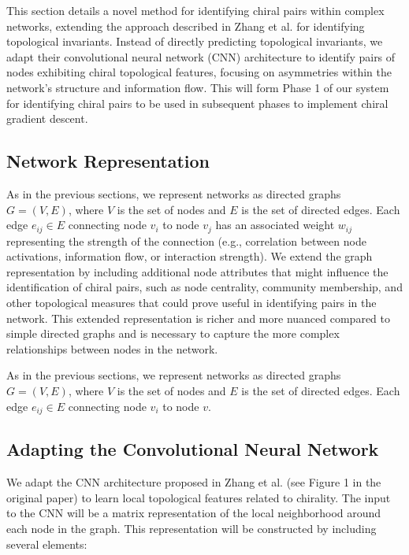 \documentclass[12pt, a4paper]{article}
\begin{document}
This section details a novel method for identifying chiral pairs within complex networks, extending the approach described in Zhang et al. \cite{zhang2018machine} for identifying topological invariants.  Instead of directly predicting topological invariants, we adapt their convolutional neural network (CNN) architecture to identify pairs of nodes exhibiting chiral topological features, focusing on asymmetries within the network's structure and information flow.  This will form Phase 1 of our system for identifying chiral pairs to be used in subsequent phases to implement chiral gradient descent.

\subsection{Network Representation}

As in the previous sections, we represent networks as directed graphs $G = (V, E)$, where $V$ is the set of nodes and $E$ is the set of directed edges. Each edge $e_{ij} \in E$ connecting node $v_i$ to node $v_{j}$ has an associated weight $w_{ij}$ representing the strength of the connection (e.g., correlation between node activations, information flow, or interaction strength). We extend the graph representation by including additional node attributes that might influence the identification of chiral pairs, such as node centrality, community membership, and other topological measures that could prove useful in identifying pairs in the network.  This extended representation is richer and more nuanced compared to simple directed graphs and is necessary to capture the more complex relationships between nodes in the network.


As in the previous sections, we represent networks as directed graphs $G = (V, E)$, where $V$ is the set of nodes and $E$ is the set of directed edges.  Each edge $e_{ij} \in E$ connecting node $v_{i}$ to node $v$.

\subsection{Adapting the Convolutional Neural Network}

We adapt the CNN architecture proposed in Zhang et al. \cite{zhang2018machine}  (see Figure 1 in the original paper) to learn local topological features related to chirality. The input to the CNN will be a matrix representation of the local neighborhood around each node in the graph.  This representation will be constructed by including several elements:
\end{document}

